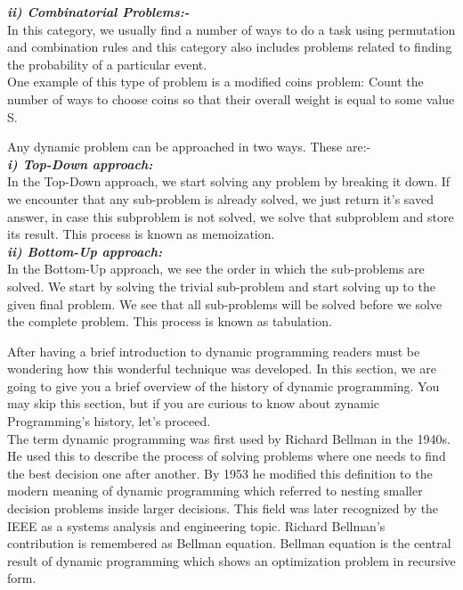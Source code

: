 \documentclass[12pt]{book}
\begin{document}
	\textbf{\textit{ii)  Combinatorial Problems:-}}\\
In this category, we usually find a number of ways to do a task using permutation and combination rules and this category also includes problems related to finding the probability of a particular event.\\
One example of this type of problem is a modified coins problem: Count the number of ways to choose coins so that their overall weight is equal to some value S.

			Any dynamic problem can be approached in two ways. These are:-\\

		\textbf{\textit{i)  Top-Down approach:}} \\
In the Top-Down approach, we start solving any problem by breaking it down. If we encounter that any sub-problem is already solved, we just return it’s saved answer, in case this subproblem is not solved, we solve that subproblem and store its result. This process is known as memoization.\\

		\textbf{\textit{ii)  Bottom-Up approach:}}\\
In the Bottom-Up approach, we see the order in which the sub-problems are solved. We start by solving the trivial sub-problem and start solving up to the given final problem. We see that all sub-problems will be solved before we solve the complete problem. This process is known as tabulation.

		After having a brief introduction to dynamic programming readers must be wondering how this wonderful technique was developed. In this section, we are going to give you a brief overview of the history of dynamic programming. You may skip this section, but if you are curious to know about zynamic Programming’s history, let’s proceed.\\

The term dynamic programming was first used by Richard Bellman in the 1940s. He used this to describe the process of solving problems where one needs to find the best decision one after another. By 1953 he modified this definition to the modern meaning of dynamic programming which referred to nesting smaller decision problems inside larger decisions. This field was later recognized by the IEEE as a systems analysis and engineering topic. Richard Bellman’s contribution is remembered as Bellman equation. Bellman equation is the central result of dynamic programming which shows an optimization problem in recursive form.\\
\end{document}
